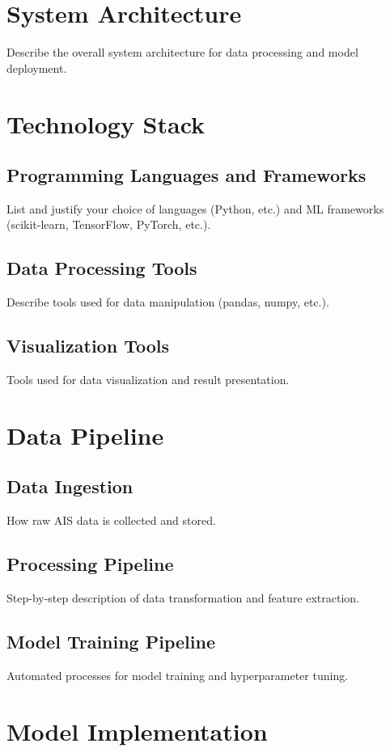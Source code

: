 
\section{System Architecture}
Describe the overall system architecture for data processing and model deployment.

\section{Technology Stack}
\subsection{Programming Languages and Frameworks}
List and justify your choice of languages (Python, etc.) and ML frameworks (scikit-learn, TensorFlow, PyTorch, etc.).

\subsection{Data Processing Tools}
Describe tools used for data manipulation (pandas, numpy, etc.).

\subsection{Visualization Tools}
Tools used for data visualization and result presentation.

\section{Data Pipeline}
\subsection{Data Ingestion}
How raw AIS data is collected and stored.

\subsection{Processing Pipeline}
Step-by-step description of data transformation and feature extraction.

\subsection{Model Training Pipeline}
Automated processes for model training and hyperparameter tuning.

\section{Model Implementation}
